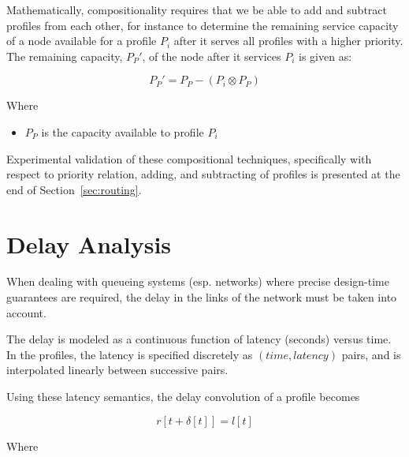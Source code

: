 Mathematically, compositionality requires that we be able to add and
subtract profiles from each other, for instance to determine the
remaining service capacity of a node available for a profile
$P_i$ after it serves all profiles with a higher priority.  The
remaining capacity, $P_P'$, of the node after it services
$P_i$ is given as:

\begin{equation}
  P_P' = P_P - ( P_i \otimes P_P )
\end{equation}

Where

\begin{itemize}
\item $P_P$ is the capacity available to profile $P_i$
\end{itemize}

Experimental validation of these compositional techniques,
specifically with respect to priority relation, adding, and
subtracting of profiles is presented at the end of
Section~\ref{sec:routing}.

\newpage

\section{Delay Analysis}
\label{sec:delay}

When dealing with queueing systems (esp. networks) where precise
design-time guarantees are required, the delay in the links of the
network must be taken into account.

The delay is modeled as a continuous function of latency (seconds)
versus time.  In the profiles, the latency is specified discretely as
$(time, latency)$ pairs, and is interpolated linearly between
successive pairs.

Using these latency semantics, the delay convolution of a profile
becomes

\begin{equation}
  r[t + \delta[t]] = l[t]
\end{equation}

Where

